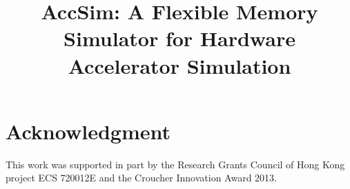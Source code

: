 \documentclass[conference]{IEEEtran}
\begin{document}
\title{AccSim: A Flexible Memory Simulator for Hardware Accelerator Simulation}

\author{
}
\maketitle

\begin{abstract}

\end{abstract}
 








\section*{Acknowledgment}
This work was supported in part by the Research Grants Council of Hong Kong project ECS 720012E and
the Croucher Innovation Award 2013. 





\end{document}
